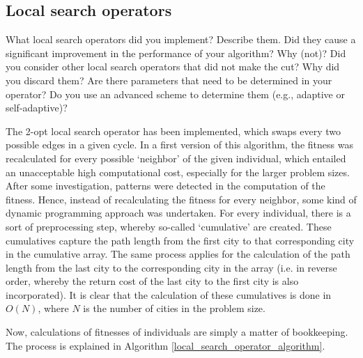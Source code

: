 \documentclass[a4paper,10pt]{article}
\newcommand{\ReplaceMe}[1]{{\color{blue}#1}}
\begin{document}
\subsection{Local search operators}
\label{local_search_operator}
\ReplaceMe{What local search operators did you implement? Describe them. Did they cause a significant improvement in the performance of your algorithm? Why (not)? Did you consider other local search operators that did not make the cut? Why did you discard them? Are there parameters that need to be determined in your operator? Do you use an advanced scheme to determine them (e.g., adaptive or self-adaptive)?}

The 2-opt local search operator has been implemented, which swaps every two possible edges in a given cycle. In a first version of this algorithm, the fitness was recalculated for every possible `neighbor' of the given individual, which entailed an unacceptable high computational cost, especially for the larger problem sizes. After some investigation, patterns were detected in the computation of the fitness. Hence, instead of recalculating the fitness for every neighbor, some kind of dynamic programming approach was undertaken. For every individual, there is a sort of preprocessing step, whereby so-called `cumulative' are created. These cumulatives capture the path length from the first city to that corresponding city in the cumulative array. The same process applies for the calculation of the path length from the last city to the corresponding city in the array (i.e. in reverse order, whereby the return cost of the last city to the first city is also incorporated). It is clear that the calculation of these cumulatives is done in $O(N)$, where $N$ is the number of cities in the problem size.

Now, calculations of fitnesses of individuals are simply a matter of bookkeeping. The process is explained in Algorithm \ref{local_search_operator_algorithm}.

\end{document}
